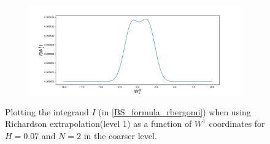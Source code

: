 \documentclass[11pt]{article}
\begin{document}
\begin{figure}[h!]
\begin{subfigure}[b]{0.4\textwidth}
		\caption{}
		\label{fig:sub4}
	\end{subfigure}
	\hfill
	\begin{subfigure}[b]{0.4\textwidth}
		\centering
		\includegraphics[width=1\linewidth]{./figures/integrand_richardson_plotting_rBergomi/N_2/W_1/Bergomi_integrand_rich_level1_K_1_H_007_y4f_N_2}
		\caption{}
		\label{fig:sub4}
	\end{subfigure}
	\caption{Plotting the integrand $I$ (in \eqref{BS_formula_rbergomi}) when using Richardson extrapolation(level 1) as a function of $W^1$ coordinates for $H=0.07$ and $N=2$ in the coarser level.}
	\label{fig:Integrand_rich_level1_H_007_N_2_W_1}
\end{figure}
\end{document}
